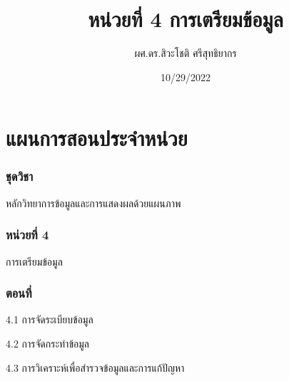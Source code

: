 \documentclass[
  letterpaper,
  DIV=11,
  numbers=noendperiod]{scrreprt}
\title{หน่วยที่ 4 การเตรียมข้อมูล}
\author{ผศ.ดร.สิวะโชติ ศรีสุทธิยากร}
\date{10/29/2022}
\renewcommand*\contentsname{Table of contents}
\newcommand\contentsname{Table of contents}
\begin{document}
\maketitle
\ifdefined\Shaded\renewenvironment{Shaded}{\begin{tcolorbox}[enhanced, borderline west={3pt}{0pt}{shadecolor}, interior hidden, frame hidden, breakable, sharp corners, boxrule=0pt]}{\end{tcolorbox}}\fi

\renewcommand*\contentsname{Table of contents}
{
\hypersetup{linkcolor=}
\setcounter{tocdepth}{2}
\tableofcontents
}

\hypertarget{uxe41uxe1cuxe19uxe01uxe32uxe23uxe2auxe2duxe19uxe1buxe23uxe30uxe08uxe33uxe2buxe19uxe27uxe22}{%
\chapter*{แผนการสอนประจำหน่วย}\label{uxe41uxe1cuxe19uxe01uxe32uxe23uxe2auxe2duxe19uxe1buxe23uxe30uxe08uxe33uxe2buxe19uxe27uxe22}}

\hypertarget{uxe0auxe14uxe27uxe0auxe32}{%
\subsection*{\texorpdfstring{\textbf{ชุดวิชา}}{ชุดวิชา}}\label{uxe0auxe14uxe27uxe0auxe32}}

หลักวิทยาการข้อมูลและการแสดงผลด้วยแผนภาพ

\hypertarget{uxe2buxe19uxe27uxe22uxe17-4}{%
\subsection*{\texorpdfstring{\textbf{หน่วยที่
4}}{หน่วยที่ 4}}\label{uxe2buxe19uxe27uxe22uxe17-4}}

การเตรียมข้อมูล

\hypertarget{uxe15uxe2duxe19uxe17}{%
\subsection*{\texorpdfstring{\textbf{ตอนที่}}{ตอนที่}}\label{uxe15uxe2duxe19uxe17}}

4.1 การจัดระเบียบข้อมูล

4.2 การจัดกระทำข้อมูล

4.3 การวิเคราะห์เพื่อสำรวจข้อมูลและการแก้ปัญหา
\end{document}
